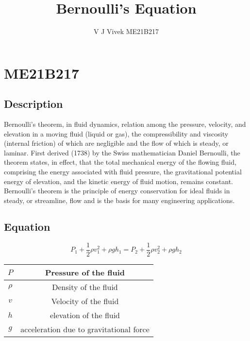 \section{ME21B217}
\subsection{}
\title{Bernoulli's Equation}
\author{V J Vivek ME21B217}		


\maketitle
\subsection{Description}
Bernoulli’s theorem, in fluid dynamics, relation among the pressure, velocity, and elevation in a moving fluid (liquid or gas), the compressibility and viscosity (internal friction) of which are negligible and the flow of which is steady, or laminar. First derived (1738) by the Swiss mathematician Daniel Bernoulli, the theorem states, in effect, that the total mechanical energy of the flowing fluid, comprising the energy associated with fluid pressure, the gravitational potential energy of elevation, and the kinetic energy of fluid motion, remains constant. Bernoulli’s theorem is the principle of energy conservation for ideal fluids in steady, or streamline, flow and is the basis for many engineering applications.
\subsection{Equation}
\begin{equation}
    P_1+\frac{1}{2}\rho v_1^2 + \rho gh_1 = P_2 + \frac{1}{2}\rho v_2^2 + \rho gh_2
\end{equation}
\begin{center}
\begin{tabular}{|c|c|}
    \hline
    \(P\) & Pressure of the fluid \\
    \hline
    \(\rho\) & Density of the fluid \\
    \hline
    \(v\) & Velocity of the fluid \\
    \hline
    \(h\) & elevation of the fluid \\
    \hline 
    \(g\) & acceleration due to gravitational force \\
    \hline
   
\end{tabular}
\end{center}


